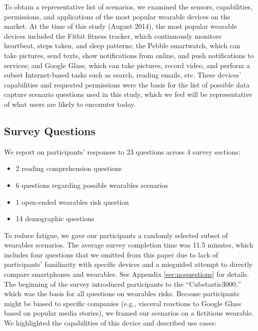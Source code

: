 \documentclass[conference]{IEEEtran}
\begin{document}
To obtain a representative list of scenarios, we examined the sensors, capabilities, permissions, and applications of the most popular wearable devices on the market. At the time of this study (August 2014), the most popular wearable devices included the Fitbit fitness tracker, which continuously monitors heartbeat, steps taken, and sleep patterns; the Pebble smartwatch, which can take pictures, send texts, show notifications from online, and push notifications to services; and Google Glass, which can take pictures, record video, and perform a subset Internet-based tasks such as search, reading emails, etc. These devices' capabilities and requested permissions were the basis for the list of possible data capture scenario questions used in this study, which we feel will be representative of what users are likely to encounter today.

\subsection{Survey Questions}
\noindent We report on participants' responses to 23 questions across 4 survey sections:  \\[-.5cm]

\begin{itemize} \itemsep1pt \parskip0pt 
\item 2 reading comprehension questions
\item 6 questions regarding possible wearables scenarios
\item 1 open-ended wearables risk question
\item 14 demographic questions %
\end{itemize}

To reduce fatigue, we gave our participants a randomly selected subset of wearables scenarios. The average survey completion time was 11.5 minutes, which includes four questions that we omitted from this paper due to lack of participants' familiarity with specific devices and a misguided attempt to directly compare smartphones and wearables. See Appendix \ref{sec:noquestions} for details.\\

The beginning of the survey introduced participants to the ``Cubetastic3000,'' which was the basis for all questions on wearables risks. Because participants might be biased to specific companies (e.g., visceral reactions to Google Glass based on popular media stories), we framed our scenarios on a fictitious wearable. We highlighted the capabilities of this device and described use cases:
\end{document}
